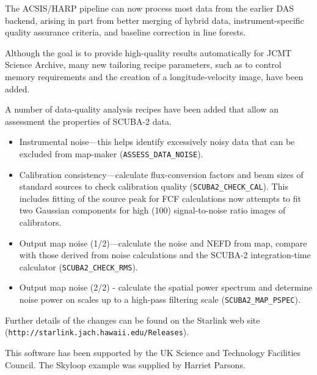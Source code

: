 \documentclass[11pt,twoside]{article}
\begin{document}

The ACSIS/HARP pipeline can now process most data from the earlier DAS
backend, arising in part from better merging of hybrid data,
instrument-specific quality assurance criteria, and baseline
correction in line forests.

Although the goal is to provide high-quality results automatically for
JCMT Science Archive, many new tailoring recipe parameters, such as to
control memory requirements and the creation of a longitude-velocity
image, have been added.


A number of data-quality analysis recipes have been added that allow
an assessment the properties of SCUBA-2 data.
\begin{itemize}
\item Instrumental noise---this helps identify excessively noisy data that
can be excluded from map-maker (\texttt{ASSESS\_DATA\_NOISE}).
\item Calibration consistency---calculate flux-conversion factors and beam
sizes of standard sources to check calibration quality
(\texttt{SCUBA2\_CHECK\_CAL}).  This includes fitting of the source peak for FCF
calculations now attempts to fit two Gaussian components for high
(100) signal-to-noise ratio images of calibrators.
\item Output map noise (1/2)---calculate the noise and NEFD from map,
compare with those derived from noise calculations and the SCUBA-2
integration-time calculator (\texttt{SCUBA2\_CHECK\_RMS}).
\item Output map noise (2/2) - calculate the spatial power spectrum and
determine noise power on scales up to a high-pass filtering scale
(\texttt{SCUBA2\_MAP\_PSPEC}).
\end{itemize}


Further details of the changes can be found on the Starlink
web site\newline
(\texttt{http://starlink.jach.hawaii.edu/Releases}).

\acknowledgements This software has been supported by the UK Science
and Technology Facilities Council.  The Skyloop example was supplied
by Harriet Parsons.


\end{document}
